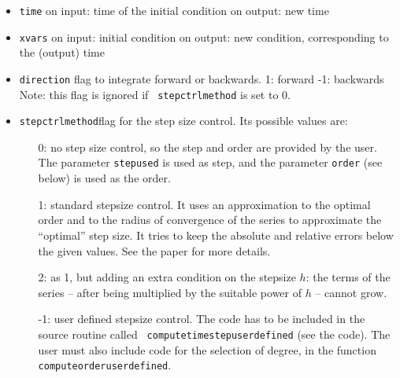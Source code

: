 \documentclass[10pt]{article}
\theoremstyle{remark}
\begin{document}
\begin{itemize}
\item {\tt time}\newline
  on input:  time of the initial condition\newline
  on output: new time
\item {\tt xvars}\newline
  on input:  initial condition\newline
  on output: new condition, corresponding to the (output) time
\item {\tt direction}\newline
  flag to integrate forward or backwards.\newline
  \hspace*{5mm} \phantom{-}1: forward\newline
  \hspace*{5mm} -1: backwards\newline
  Note: this flag is ignored if {\tt
    stepctrlmethod} is set to 0.
\item {\tt stepctrlmethod}\newline flag for the
  step size control. Its possible values are:
  \begin{itemize}
  \item[\phantom{-}0:] no step size control, so the step and order are
    provided by the user. The parameter \verb+stepused+ is used as
    step, and the parameter \verb+order+ (see below) is used as the
    order.
  \item[\phantom{-}1:] standard stepsize control. It uses an
    approximation to the optimal order and to the radius of
    convergence of the series to approximate the ``optimal'' step
    size. It tries to keep the absolute and relative errors below the
    given values. See the paper \cite{JZ} for more details.
  \item[\phantom{-}2:] as 1, but adding an extra condition on the
    stepsize $h$: the terms of the series -- after being multiplied by
    the suitable power of $h$ -- cannot grow.
  \item[-1:] user defined stepsize control. The code has to be
    included in the source routine called {\tt
      computetimestepuserdefined}
    (see the code). The user must also include code for the selection
    of degree, in the function {\tt
      computeorderuserdefined}.
  \end{itemize}

\end{itemize}
\end{document}

